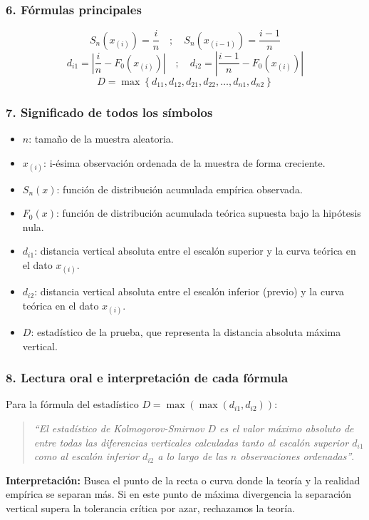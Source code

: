 \documentclass[11pt,a4paper]{article}
\begin{document}
\subsubsection{6. Fórmulas principales}
\begin{tcolorbox}[colback=yellow!5!white,colframe=yellow!60!black,title=Estadístico K-S Unimuestral]
    \[ S_n(x_{(i)}) = \frac{i}{n} \quad ; \quad S_n(x_{(i-1)}) = \frac{i-1}{n} \]
    \[ d_{i1} = \left| \frac{i}{n} - F_0(x_{(i)}) \right| \quad ; \quad d_{i2} = \left| \frac{i-1}{n} - F_0(x_{(i)}) \right| \]
    \[ D = \max \left\{ d_{11}, d_{12}, d_{21}, d_{22}, \dots, d_{n1}, d_{n2} \right\} \]
\end{tcolorbox}

\subsubsection{7. Significado de todos los símbolos}
\begin{itemize}
    \item $n$: tamaño de la muestra aleatoria.
    \item $x_{(i)}$: i-ésima observación ordenada de la muestra de forma creciente.
    \item $S_n(x)$: función de distribución acumulada empírica observada.
    \item $F_0(x)$: función de distribución acumulada teórica supuesta bajo la hipótesis nula.
    \item $d_{i1}$: distancia vertical absoluta entre el escalón superior y la curva teórica en el dato $x_{(i)}$.
    \item $d_{i2}$: distancia vertical absoluta entre el escalón inferior (previo) y la curva teórica en el dato $x_{(i)}$.
    \item $D$: estadístico de la prueba, que representa la distancia absoluta máxima vertical.
\end{itemize}

\subsubsection{8. Lectura oral e interpretación de cada fórmula}
Para la fórmula del estadístico $D = \max \left( \max(d_{i1}, d_{i2}) \right)$:
\begin{quote}
    \textit{``El estadístico de Kolmogorov-Smirnov $D$ es el valor máximo absoluto de entre todas las diferencias verticales calculadas tanto al escalón superior $d_{i1}$ como al escalón inferior $d_{i2}$ a lo largo de las $n$ observaciones ordenadas''}.
\end{quote}
\textbf{Interpretación:} Busca el punto de la recta o curva donde la teoría y la realidad empírica se separan más. Si en este punto de máxima divergencia la separación vertical supera la tolerancia crítica por azar, rechazamos la teoría.
\end{document}
